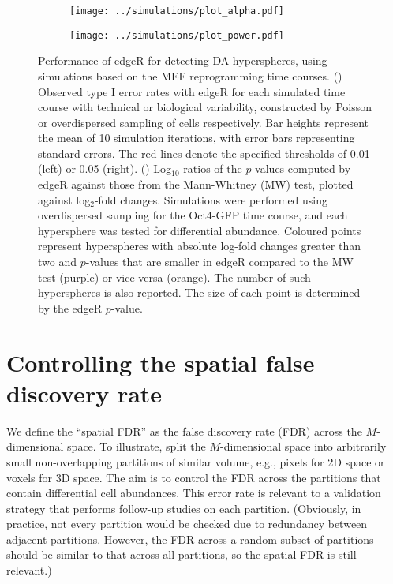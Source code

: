 \documentclass{article}
\begin{document}
\begin{figure}[bt]
\begin{subfigure}[b]{0.48\textwidth}
    \texttt{[image: ../simulations/plot\_alpha.pdf]}
\caption{}
\label{fig:alpha}
\end{subfigure}
\begin{subfigure}[b]{0.48\textwidth}
    \texttt{[image: ../simulations/plot\_power.pdf]}
\caption{}
\label{fig:power}
\end{subfigure}
\caption{
Performance of edgeR for detecting DA hyperspheres, using simulations based on the MEF reprogramming time courses.
() Observed type I error rates with edgeR for each simulated time course with technical or biological variability, constructed by Poisson or overdispersed sampling of cells respectively.
Bar heights represent the mean of 10 simulation iterations, with error bars representing standard errors.
The red lines denote the specified thresholds of 0.01 (left) or 0.05 (right).
() Log$_{10}$-ratios of the $p$-values computed by edgeR against those from the Mann-Whitney (MW) test, plotted against log$_{2}$-fold changes.
Simulations were performed using overdispersed sampling for the Oct4-GFP time course, and each hypersphere was tested for differential abundance.
Coloured points represent hyperspheres with absolute log-fold changes greater than two and $p$-values that are smaller in edgeR compared to the MW test (purple) or vice versa (orange).
The number of such hyperspheres is also reported.
The size of each point is determined by the edgeR $p$-value.
}
\label{fig:testtest}
\end{figure}

\section{Controlling the spatial false discovery rate}
We define the ``spatial FDR'' as the false discovery rate (FDR) across the $M$-dimensional space.
To illustrate, split the $M$-dimensional space into arbitrarily small non-overlapping partitions of similar volume, e.g., pixels for 2D space or voxels for 3D space.
The aim is to control the FDR across the partitions that contain differential cell abundances.
This error rate is relevant to a validation strategy that performs follow-up studies on each partition. 
(Obviously, in practice, not every partition would be checked due to redundancy between adjacent partitions.
However, the FDR across a random subset of partitions should be similar to that across all partitions, so the spatial FDR is still relevant.)
\end{document}
